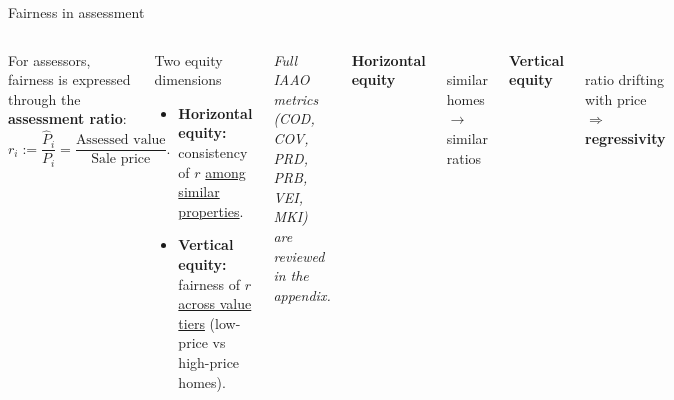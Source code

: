 \documentclass[aspectratio=169,12pt,]{beamer}
\newcommand{\1}{\mathbf{1}}
\begin{document}
\begin{frame}{Fairness in assessment}

\begin{columns}[T,onlytextwidth]

For assessors, fairness is expressed through the \textbf{assessment ratio}:
\vspace{-1mm}
\[
r_i := \frac{\widehat{P}_i}{P_i} = \frac{\text{Assessed value}}{\text{Sale price}}.
\]

\medskip

\begin{block}{ Two equity dimensions}
\begin{itemize}
    \item \textbf{Horizontal equity:} consistency of $r$ \underline{among similar properties}.
    \item \textbf{Vertical equity:} fairness of $r$ \underline{across value tiers} (low-price vs high-price homes).
\end{itemize}
\end{block}

{\footnotesize\itshape
Full IAAO metrics (COD, COV, PRD, PRB, VEI, MKI) are reviewed in the appendix.
}

\centering
\small\textbf{Horizontal equity}\\[1mm]
\\[1mm]
{\scriptsize similar homes $\rightarrow$ similar ratios}

\vspace{4mm}

\small\textbf{Vertical equity}\\[1mm]
\\[1mm]
{\scriptsize ratio drifting with price $\Rightarrow$ {\color{red}\textbf{regressivity}}}

\end{columns}

\end{frame}
\end{document}
